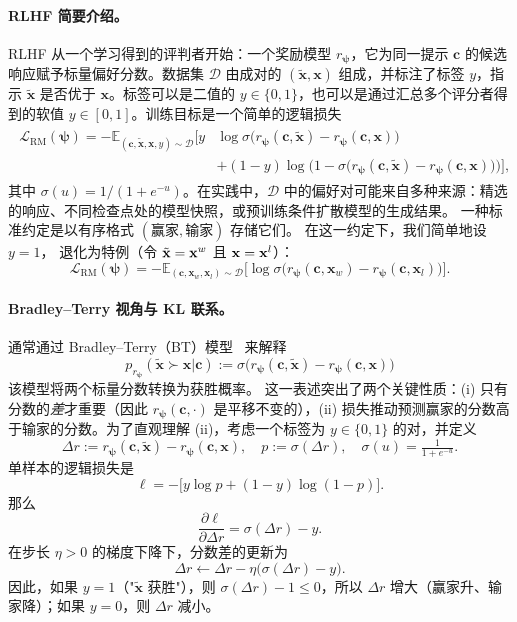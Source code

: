 \paragraph{RLHF 简要介绍。}
RLHF 从一个学习得到的评判者开始：一个奖励模型 $r_{\bm\psi}$，它为同一提示 $\mathbf c$ 的候选响应赋予标量偏好分数。数据集 $\mathcal D$ 由成对的 $(\tilde{\mathbf x},\mathbf x)$ 组成，并标注了标签 $y$，指示 $\tilde{\mathbf x}$ 是否优于 $\mathbf x$。标签可以是二值的 $y\in\{0,1\}$，也可以是通过汇总多个评分者得到的软值 $y\in[0,1]$。训练目标是一个简单的逻辑损失
\begin{align}\label{eq:rm-emp}
\begin{aligned}
    \mathcal L_{\mathrm{RM}}(\bm\psi)
=
- \mathbb E_{(\mathbf c,\tilde{\mathbf x},\mathbf x,y)\sim\mathcal D}
\Big[
y &\log \sigma \big(r_{\bm\psi}(\mathbf c,\tilde{\mathbf x})-r_{\bm\psi}(\mathbf c,\mathbf x)\big)
\\ &+(1-y)\log \big(1-\sigma \big(r_{\bm\psi}(\mathbf c,\tilde{\mathbf x})-r_{\bm\psi}(\mathbf c,\mathbf x)\big)\big)
\Big],
\end{aligned}
\end{align}
其中 $\sigma(u)=1/(1+e^{-u})$。在实践中，$\mathcal D$ 中的偏好对可能来自多种来源：精选的响应、不同检查点处的模型快照，或预训练条件扩散模型的生成结果。
一种标准约定是以有序格式 $(\text{赢家}, \text{输家})$ 存储它们。
在这一约定下，我们简单地设 $y=1$， 退化为特例（令 $\tilde{{\mathbf{x}}} = {\mathbf{x}}^w$ 且 ${\mathbf{x}} = {\mathbf{x}}^l$）：
\begin{equation}\label{eq:rm-bt}
\mathcal L_{\mathrm{RM}}(\bm\psi)
=
- \mathbb E_{(\mathbf c,\mathbf x_w,\mathbf x_l)\sim\mathcal D}
\Big[\log \sigma \big(r_{\bm\psi}(\mathbf c,\mathbf x_w)-r_{\bm\psi}(\mathbf c,\mathbf x_l)\big)\Big].
\end{equation}


\paragraph{Bradley--Terry 视角与 KL 联系。}
通常通过 Bradley--Terry（BT）模型~\citep{bradley1952rank} 来解释
\[
p_{r_{\bm\psi}}(\tilde{\mathbf x}\succ \mathbf x|\mathbf c)
 := \sigma \big(r_{\bm\psi}(\mathbf c,\tilde{\mathbf x})-r_{\bm\psi}(\mathbf c,\mathbf x)\big)
\]
该模型将两个标量分数转换为获胜概率。
这一表述突出了两个关键性质：(i) 只有分数的\emph{差}才重要（因此 $r_{\bm\psi}(\mathbf c,\cdot)$ 是平移不变的），(ii) 损失推动预测赢家的分数高于输家的分数。为了直观理解 (ii)，考虑一个标签为 $y\in\{0,1\}$ 的对，并定义
\[
\Delta r := r_{\bm\psi}(\mathbf c,\tilde{\mathbf x})-r_{\bm\psi}(\mathbf c,\mathbf x),
\quad
p:=\sigma(\Delta r),\quad \sigma(u)=\tfrac{1}{1+e^{-u}}.
\]
单样本的逻辑损失是
\[
\ell=-\big[y\log p+(1-y)\log(1-p)\big].
\]
那么
\[
\frac{\partial \ell}{\partial \Delta r}=\sigma(\Delta r)-y.
\]
在步长 $\eta>0$ 的梯度下降下，分数差的更新为
\[
\Delta r \leftarrow \Delta r-\eta\big(\sigma(\Delta r)-y\big).
\]
因此，如果 $y=1$（"$\tilde{\mathbf x}$ 获胜"），则 $\sigma(\Delta r)-1\le 0$，所以 $\Delta r$ 增大（赢家升、输家降）；如果 $y=0$，则 $\Delta r$ 减小。


